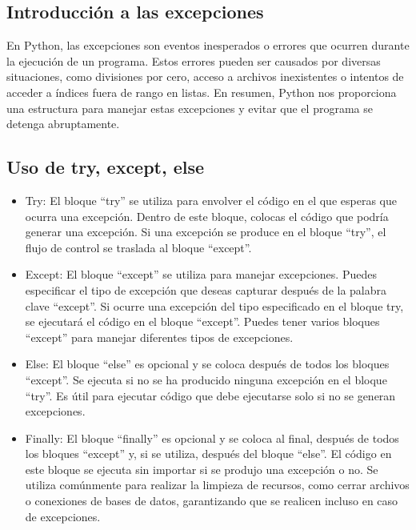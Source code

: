 \subsection{Introducción a las excepciones}
En Python, las excepciones son eventos inesperados o errores que ocurren durante la ejecución de un programa. Estos errores pueden ser causados por diversas situaciones, como divisiones por cero, acceso a archivos inexistentes o intentos de acceder a índices fuera de rango en listas. En resumen, Python nos proporciona una estructura para manejar estas excepciones y evitar que el programa se detenga abruptamente.

\subsection{Uso de try, except, else}
\begin{itemize}
    \item Try: El bloque ``try'' se utiliza para envolver el código en el que esperas que ocurra una excepción. Dentro de este bloque, colocas el código que podría generar una excepción. Si una excepción se produce en el bloque ``try'', el flujo de control se traslada al bloque ``except''.
    \item Except: El bloque ``except'' se utiliza para manejar excepciones. Puedes especificar el tipo de excepción que deseas capturar después de la palabra clave ``except''. Si ocurre una excepción del tipo especificado en el bloque try, se ejecutará el código en el bloque ``except''. Puedes tener varios bloques ``except'' para manejar diferentes tipos de excepciones.
    \item Else: El bloque ``else'' es opcional y se coloca después de todos los bloques ``except''. Se ejecuta si no se ha producido ninguna excepción en el bloque ``try''. Es útil para ejecutar código que debe ejecutarse solo si no se generan excepciones.
    \item Finally: El bloque ``finally'' es opcional y se coloca al final, después de todos los bloques ``except'' y, si se utiliza, después del bloque ``else''. El código en este bloque se ejecuta sin importar si se produjo una excepción o no. Se utiliza comúnmente para realizar la limpieza de recursos, como cerrar archivos o conexiones de bases de datos, garantizando que se realicen incluso en caso de excepciones.
\end{itemize}

